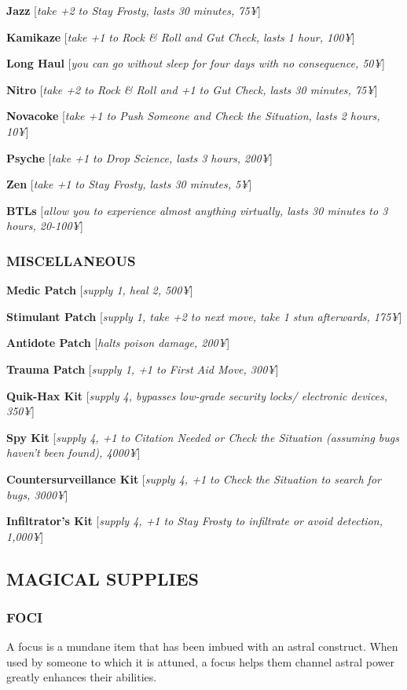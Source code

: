 \documentclass[oneside,10pt]{article}
\begin{document}
\begin{multicols}{2}
\textbf{Jazz} [\textit{take +2 to Stay Frosty,
  lasts 30 minutes, 75¥}]

\textbf{Kamikaze} [\textit{take +1 to Rock \& Roll and Gut Check, lasts 1
hour, 100¥}]

\textbf{Long Haul} [\textit{you can go without sleep for four days with no
consequence, 50¥}]

\textbf{Nitro} [\textit{take +2 to Rock \& Roll and +1 to Gut Check, lasts 30
minutes, 75¥}]

\textbf{Novacoke} [\textit{take +1 to Push Someone and Check the Situation, lasts 2 hours, 10¥}]

\textbf{Psyche} [\textit{take +1 to Drop Science,
  lasts 3 hours, 200¥}]

\textbf{Zen} [\textit{take +1 to Stay Frosty,
  lasts 30 minutes, 5¥}]

\textbf{BTLs} [\textit{allow you to experience almost anything virtually, lasts
30 minutes to 3 hours, 20-100¥}]


\subsubsection{MISCELLANEOUS}
\textbf{Medic Patch} [\textit{supply 1, heal 2,
  500¥}]

\textbf{Stimulant Patch} [\textit{supply 1, take +2 to next move, take 1 stun
afterwards, 175¥}]

\textbf{Antidote Patch} [\textit{halts poison
  damage, 200¥}]

\textbf{Trauma Patch} [\textit{supply 1, +1 to
  First Aid Move, 300¥}]

\textbf{Quik-Hax Kit} [\textit{supply 4, bypasses low-grade security locks/
electronic devices, 350¥}]

\textbf{Spy Kit} [\textit{supply 4, +1 to Citation Needed or Check the Situation (assuming bugs haven’t been found), 4000¥}]

\textbf{Countersurveillance Kit} [\textit{supply 4, +1 to Check the Situation to search for bugs, 3000¥}]

\textbf{Infiltrator’s Kit} [\textit{supply 4, +1 to Stay Frosty to infiltrate or
avoid detection, 1,000¥}]

\subsection{MAGICAL SUPPLIES}
\subsubsection{FOCI}
A focus is a mundane item that has been imbued with an astral construct. When used by someone to which it is attuned,
a focus helps them channel astral power greatly enhances
their abilities.


\end{multicols}
\end{document}
